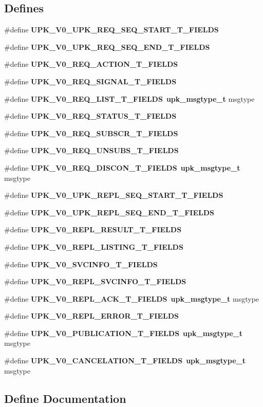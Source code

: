 \subsection*{Defines}
\begin{DoxyCompactItemize}
\item 
\#define {\bf UPK\_\-V0\_\-UPK\_\-REQ\_\-SEQ\_\-START\_\-T\_\-FIELDS}
\item 
\#define {\bf UPK\_\-V0\_\-UPK\_\-REQ\_\-SEQ\_\-END\_\-T\_\-FIELDS}
\item 
\#define {\bf UPK\_\-V0\_\-REQ\_\-ACTION\_\-T\_\-FIELDS}
\item 
\#define {\bf UPK\_\-V0\_\-REQ\_\-SIGNAL\_\-T\_\-FIELDS}
\item 
\#define {\bf UPK\_\-V0\_\-REQ\_\-LIST\_\-T\_\-FIELDS}~{\bf upk\_\-msgtype\_\-t}       msgtype
\item 
\#define {\bf UPK\_\-V0\_\-REQ\_\-STATUS\_\-T\_\-FIELDS}
\item 
\#define {\bf UPK\_\-V0\_\-REQ\_\-SUBSCR\_\-T\_\-FIELDS}
\item 
\#define {\bf UPK\_\-V0\_\-REQ\_\-UNSUBS\_\-T\_\-FIELDS}
\item 
\#define {\bf UPK\_\-V0\_\-REQ\_\-DISCON\_\-T\_\-FIELDS}~{\bf upk\_\-msgtype\_\-t}       msgtype
\item 
\#define {\bf UPK\_\-V0\_\-UPK\_\-REPL\_\-SEQ\_\-START\_\-T\_\-FIELDS}
\item 
\#define {\bf UPK\_\-V0\_\-UPK\_\-REPL\_\-SEQ\_\-END\_\-T\_\-FIELDS}
\item 
\#define {\bf UPK\_\-V0\_\-REPL\_\-RESULT\_\-T\_\-FIELDS}
\item 
\#define {\bf UPK\_\-V0\_\-REPL\_\-LISTING\_\-T\_\-FIELDS}
\item 
\#define {\bf UPK\_\-V0\_\-SVCINFO\_\-T\_\-FIELDS}
\item 
\#define {\bf UPK\_\-V0\_\-REPL\_\-SVCINFO\_\-T\_\-FIELDS}
\item 
\#define {\bf UPK\_\-V0\_\-REPL\_\-ACK\_\-T\_\-FIELDS}~{\bf upk\_\-msgtype\_\-t}           msgtype
\item 
\#define {\bf UPK\_\-V0\_\-REPL\_\-ERROR\_\-T\_\-FIELDS}
\item 
\#define {\bf UPK\_\-V0\_\-PUBLICATION\_\-T\_\-FIELDS}~{\bf upk\_\-msgtype\_\-t}       msgtype
\item 
\#define {\bf UPK\_\-V0\_\-CANCELATION\_\-T\_\-FIELDS}~{\bf upk\_\-msgtype\_\-t}       msgtype
\end{DoxyCompactItemize}


\subsection{Define Documentation}

